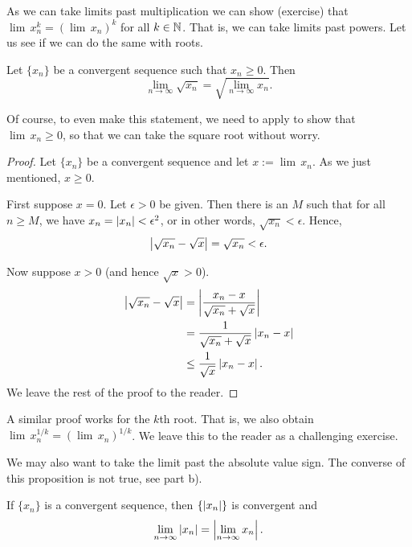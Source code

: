 As we can take limits past multiplication we can show (exercise)
that $\lim\, x_n^k = {(\lim\, x_n)}^k$ for all $k \in {\mathbb{N}}$.
That is, we can take limits
past powers.  Let us see if we can do the same with roots.

\begin{prop}
\pagebreak[2]
Let $\{ x_n \}$ be a convergent sequence such
that $x_n \geq 0$.
Then
\begin{equation*}
\lim_{n\to\infty} \sqrt{x_n} =
\sqrt{ \lim_{n\to\infty} x_n } .
\end{equation*}
\end{prop}

Of course, to even make this statement, we need to apply
 to show
that
$\lim\, x_n \geq 0$, so that we can take the square root without
worry.

\begin{proof}
Let $\{ x_n \}$ be a convergent sequence and let $x := \lim\, x_n$.
As we just mentioned, $x \geq 0$.

First suppose $x=0$.  Let $\epsilon > 0$ be given.
Then there is an $M$ such that for all $n \geq M$, we have
$x_n = \left\lvert {x_n} \right\rvert < \epsilon^2$, or in other words, $\sqrt{x_n} < \epsilon$.
Hence,
\begin{equation*}
\left\lvert {\sqrt{x_n} - \sqrt{x}} \right\rvert =
\sqrt{x_n} < \epsilon.
\end{equation*}

Now suppose $x > 0$ (and hence $\sqrt{x} > 0$).
\begin{equation*}
\begin{split}
\left\lvert {\sqrt{x_n}-\sqrt{x}} \right\rvert &= 
\left\lvert {\frac{x_n-x}{\sqrt{x_n}+\sqrt{x}}} \right\rvert \\
&=
\frac{1}{\sqrt{x_n}+\sqrt{x}}
\left\lvert {x_n-x} \right\rvert \\
& \leq
\frac{1}{\sqrt{x}}
\left\lvert {x_n-x} \right\rvert .
\end{split}
\end{equation*}
We leave the rest of the proof to the reader.
\end{proof}

A similar proof works for the $k$th root.  That is, we also
obtain
$\lim\, x_n^{1/k} = {( \lim\, x_n )}^{1/k}$.  We leave this to the reader
as a challenging exercise.

We may also want to take the limit past the absolute value sign.
The converse of this proposition is not true, see
 part b).

\begin{prop}
If $\{ x_n \}$ is a convergent sequence, then $\{ \left\lvert {x_n} \right\rvert \}$
is convergent and
\begin{equation*}
\lim_{n\to\infty} \left\lvert {x_n} \right\rvert = 
\left\lvert {\lim_{n\to\infty} x_n} \right\rvert .
\end{equation*}
\end{prop}

